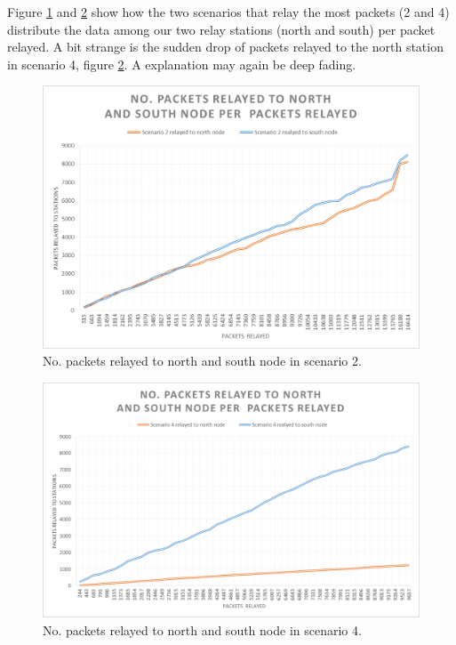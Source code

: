 \noindent Figure \ref{fig:nopacketsrelayedscenario2} and \ref{fig:nopacketsrelayedscenario4} show how the two scenarios that relay the most packets (2 and 4) distribute the data among our two relay stations (north and south) per packet relayed. A bit strange is the sudden drop of packets relayed to the north station in scenario 4, figure  \ref{fig:nopacketsrelayedscenario4}. A explanation may again be deep fading.

\begin{figure}[h]
	\centering
	\includegraphics[width=1\linewidth]{results/NoPacketsRelayedScenario2}
	\caption{No. packets relayed to north and south node in scenario 2.}
	\label{fig:nopacketsrelayedscenario2}
\end{figure}

\begin{figure}[h]
	\centering
	\includegraphics[width=1\linewidth]{results/NoPacketsRelayedScenario4}
	\caption{No. packets relayed to north and south node in scenario 4.}
	\label{fig:nopacketsrelayedscenario4}
\end{figure}
